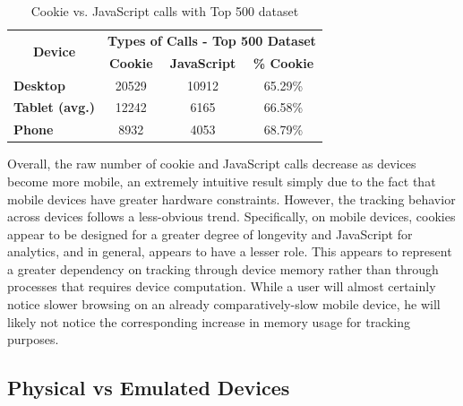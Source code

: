 \documentclass{acm_proc_article-sp}
\begin{document}
\begin{table}[h]
  \centering
  \caption{Cookie vs. JavaScript calls with Top 500 dataset}
    \begin{tabular}{|c|c|c|c|}
    \hline
    \multicolumn{1}{|c|}{\multirow{2}[4]{*}{\textbf{Device}}} & \multicolumn{3}{|c|}{\textbf{Types of Calls - Top 500 Dataset}} \\ \cline{2-4}
    \multicolumn{1}{|c|}{} & \multicolumn{1}{|c|}{\textbf{Cookie}} & \multicolumn{1}{|c|}{\textbf{JavaScript}} & \multicolumn{1}{|c|}{\textbf{\% Cookie}}  \\ \hline
    \multicolumn{1}{|l|}{\textbf{Desktop}} & 20529  & 10912  & 65.29\% \\
    \multicolumn{1}{|l|}{\textbf{Tablet (avg.)}} & 12242   & 6165 & 66.58\%  \\
    \multicolumn{1}{|l|}{\textbf{Phone}} & 8932  & 4053  & 68.79\% \\ \hline
    \end{tabular}%
  \label{tab:dm_cj_500}%
\end{table}%

Overall, the raw number of cookie and JavaScript calls decrease as devices become more mobile, an extremely intuitive result simply due to the fact that mobile devices have greater hardware constraints. However, the tracking behavior across devices follows a less-obvious trend. Specifically, on mobile devices, cookies appear to be designed for a greater degree of longevity and JavaScript for analytics, and in general, appears to have a lesser role. This appears to represent a greater dependency on tracking through device memory rather than through processes that requires device computation. While a user will almost certainly notice slower browsing on an already comparatively-slow mobile device, he will likely not notice the corresponding increase in memory usage for tracking purposes.



\subsection{Physical vs Emulated Devices}
\end{document}
